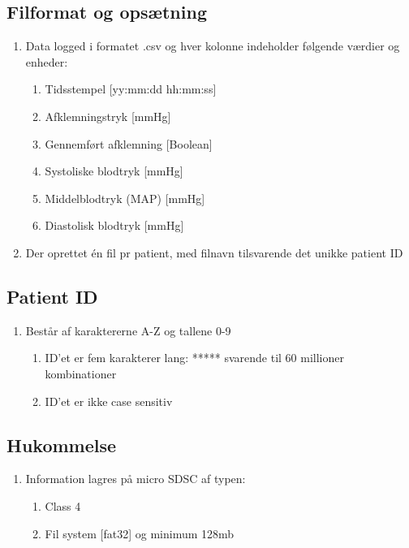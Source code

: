 \documentclass[11pt]{article}
\begin{document}
	\subsection{Filformat og opsætning}
	\begin{enumerate}
		\setlength\itemsep{0cm} %
		\item Data logged i formatet .csv og hver kolonne indeholder følgende værdier og enheder: 
		\begin{enumerate}
			\item Tidsstempel [yy:mm:dd hh:mm:ss]
			\item Afklemningstryk [mmHg]
			\item Gennemført afklemning [Boolean]
			\item Systoliske blodtryk [mmHg]
			\item Middelblodtryk (MAP) [mmHg]
			\item Diastolisk blodtryk [mmHg]
		\end{enumerate}
		\item Der oprettet én fil pr patient, med filnavn tilsvarende det unikke patient ID
	\end{enumerate}
	
	\subsection{Patient ID}
	\begin{enumerate}
		\setlength\itemsep{0cm} %
		\item Består af karaktererne A-Z og tallene 0-9
		\begin{enumerate}
			\item ID’et er fem karakterer lang: ***** svarende til 60 millioner kombinationer
			\item ID’et er ikke case sensitiv
		\end{enumerate}
	\end{enumerate}
	
	
	\subsection{Hukommelse}
	\begin{enumerate}
		\setlength\itemsep{0cm} %
		\item Information lagres på micro SDSC af typen:
		\begin{enumerate}
			\item Class 4
			\item Fil system [fat32] og minimum 128mb
		\end{enumerate}
	\end{enumerate}
	
\end{document}
